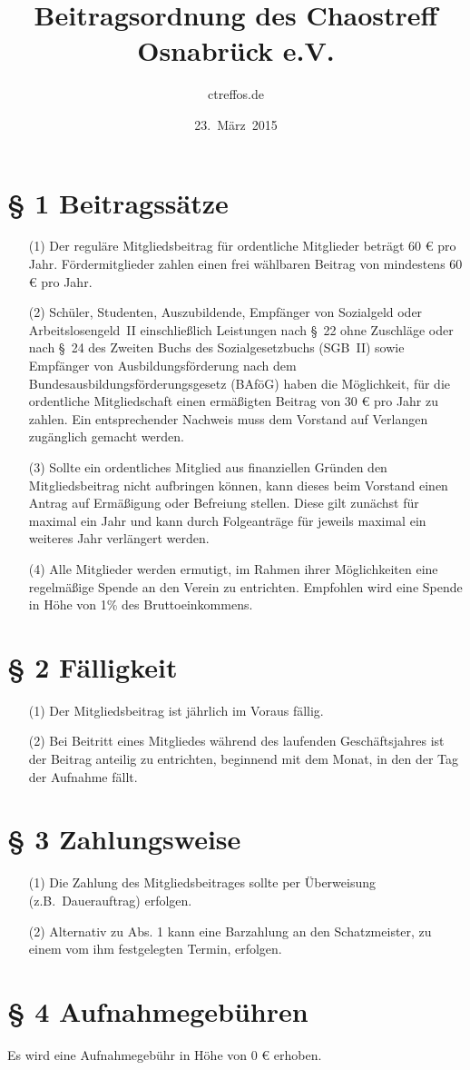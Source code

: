\documentclass[a4paper,12pt]{scrartcl}
\title{Beitragsordnung des Chaostreff Osnabrück e.V.}
\author{ctreffos.de}
\date{23.~März~2015}
\begin{document}
\maketitle

\section*{\S{} 1 Beitragssätze}
\begin{enumerate}
\item[(1)]
Der reguläre Mitgliedsbeitrag für ordentliche Mitglieder beträgt 60 €
pro Jahr. Fördermitglieder zahlen einen frei wählbaren Beitrag von
mindestens 60 € pro Jahr.
\item[(2)]
Schüler, Studenten, Auszubildende, Empfänger von Sozialgeld oder
Arbeitslosengeld~II einschließlich Leistungen nach §~22 ohne Zuschläge
oder nach §~24 des Zweiten Buchs des Sozialgesetzbuchs (SGB~II) sowie
Empfänger von Ausbildungsförderung nach dem
Bundesausbildungsförderungsgesetz (BAföG) haben die Möglichkeit, für
die ordentliche Mitgliedschaft einen ermäßigten Beitrag von 30 € pro
Jahr zu zahlen. Ein entsprechender Nachweis muss dem Vorstand auf
Verlangen zugänglich gemacht werden.
\item[(3)]
Sollte ein ordentliches Mitglied aus finanziellen Gründen den
Mitgliedsbeitrag nicht aufbringen können, kann dieses beim Vorstand
einen Antrag auf Ermäßigung oder Befreiung stellen. Diese gilt
zunächst für maximal ein Jahr und kann durch Folgeanträge für jeweils
maximal ein weiteres Jahr verlängert werden.
\item[(4)]
Alle Mitglieder werden ermutigt, im Rahmen ihrer Möglichkeiten eine
regelmäßige Spende an den Verein zu entrichten. Empfohlen wird eine
Spende in Höhe von 1\% des Bruttoeinkommens.
\end{enumerate}

\section*{\S{} 2 Fälligkeit}
\begin{enumerate}
\item[(1)]
Der Mitgliedsbeitrag ist jährlich im Voraus fällig.
\item[(2)]
Bei Beitritt eines Mitgliedes während des laufenden Geschäftsjahres ist der Beitrag 
anteilig zu entrichten, beginnend mit dem Monat, in den der Tag der Aufnahme fällt.
\end{enumerate}

\section*{\S{} 3 Zahlungsweise}
\begin{enumerate}
\item[(1)]
Die Zahlung des Mitgliedsbeitrages sollte per Überweisung (z.B.\
Dauerauftrag) erfolgen.
\item[(2)]
Alternativ zu Abs. 1 kann eine Barzahlung an 
den Schatzmeister, zu einem vom ihm festgelegten Termin, erfolgen.
\end{enumerate}

\section*{\S{} 4 Aufnahmegebühren}
Es wird eine Aufnahmegebühr in Höhe von 0 € erhoben.
\end{document}
